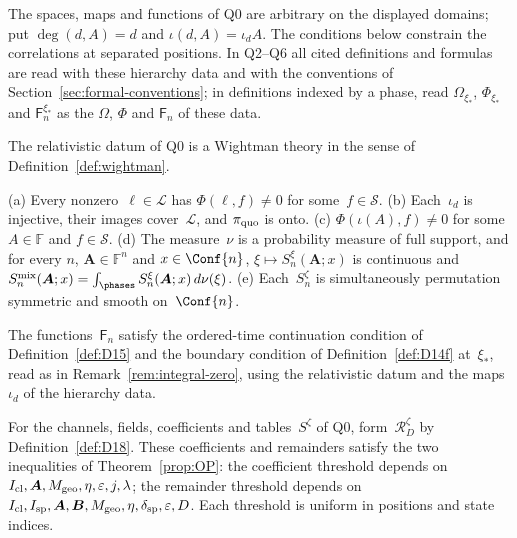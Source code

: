 The spaces, maps and functions of Q0 are arbitrary on the displayed domains; put $\deg(d,A)=d$ and $\iota(d,A)=\iota_dA$. The conditions below constrain the correlations at separated positions. In Q2--Q6 all cited definitions and formulas are read with these hierarchy data and with the conventions of Section~\ref{sec:formal-conventions}; in definitions indexed by a phase, read $\Omega_{\xi_*}$, $\Phi_{\xi_*}$ and $\mathsf F_n^{\xi_*}$ as the $\Omega$, $\Phi$ and $\mathsf F_n$ of these data.

\begin{definition}\label{def:Q2}
The relativistic datum of Q0 is a Wightman theory in the sense of Definition~\ref{def:wightman}.
\end{definition}

\begin{definition}\label{def:Q3}
\textup{(a)} Every nonzero~$\ell\in\mathcal L$ has $\Phi(\ell,f)\ne0$ for some~$f\in\mathcal S$.
\textup{(b)} Each~$\iota_d$ is injective, their images cover~$\mathcal L$, and $\pi_{\rm quo}$ is onto.
\textup{(c)} $\Phi(\iota(A),f)\ne0$ for some~$A\in\mathbb F$ and $f\in\mathcal S$.
\textup{(d)} The measure~$\nu$ is a probability measure of full support, and for every $n$, $\boldsymbol A\in\mathbb F^n$ and $x\in\Conf{n}$, $\xi\mapsto S_n^\xi(\boldsymbol A;x)$ is continuous and $S_n^{\rm mix}(\boldsymbol A;x)=\int_{\phases}S_n^\xi(\boldsymbol A;x)\,d\nu(\xi)$.
\textup{(e)} Each~$S_n^\zeta$ is simultaneously permutation symmetric and smooth on~$\Conf{n}$.
\end{definition}

\begin{definition}\label{def:Q4}
The functions~$\mathsf F_n$ satisfy the ordered-time continuation condition of Definition~\ref{def:D15} and the boundary condition of Definition~\ref{def:D14f} at~$\xi_*$, read as in Remark~\ref{rem:integral-zero}, using the relativistic datum and the maps~$\iota_d$ of the hierarchy data.
\end{definition}

\begin{definition}[Q5. Products]\label{def:Q5}
For the channels, fields, coefficients and tables~$S^\zeta$ of Q0, form~$\mathcal R_D^\zeta$ by Definition~\ref{def:D18}. These coefficients and remainders satisfy the two inequalities of Theorem~\ref{prop:OP}: the coefficient threshold depends on $I_{\rm cl},\boldsymbol A,M_{\rm geo},\eta,\varepsilon,j,\lambda$; the remainder threshold depends on $I_{\rm cl},I_{\rm sp},\boldsymbol A,\boldsymbol B,M_{\rm geo},\eta,\delta_{\rm sp},\varepsilon,D$. Each threshold is uniform in positions and state indices.
\end{definition}

